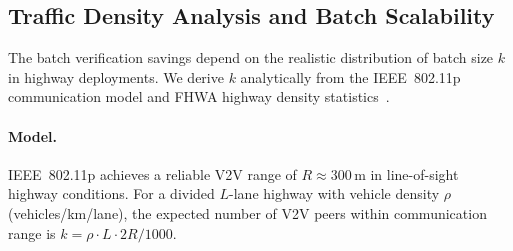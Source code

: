 \subsection{Traffic Density Analysis and Batch Scalability}
\label{sec:traffic_density}

The batch verification savings depend on the realistic distribution of batch size
$k$ in highway deployments. We derive $k$ analytically from the IEEE~802.11p
communication model and FHWA highway density statistics~\cite{fhwa2023}.

\paragraph{Model.}
IEEE~802.11p achieves a reliable V2V range of $R \approx 300$\,m in
line-of-sight highway conditions. For a divided $L$-lane highway with vehicle
density $\rho$ (vehicles/km/lane), the expected number of V2V peers within
communication range is $k = \rho \cdot L \cdot 2R/1000$.

\begin{table}[t]
\centering
\caption{Expected Batch Size $k$, Verification Time, and CPU Utilisation
(3-lane highway, $R = 300$\,m, RPi~4 measured values)}
\label{tab:batch_density}
\end{table}

